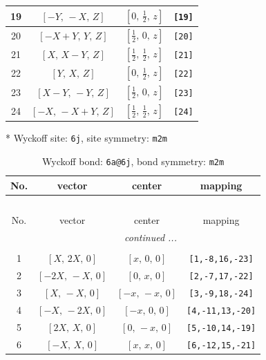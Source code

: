 \documentclass[fleqn,8pt]{jsarticle}
\begin{document}
\begin{longtable}{cccc}
19 & $\left[ - Y,\, - X,\, Z \right]$ & $\left[ 0,\, \frac{1}{2},\, z \right]$ & {\tt [19]} \\ \hline
20 & $\left[ - X + Y,\, Y,\, Z \right]$ & $\left[ \frac{1}{2},\, 0,\, z \right]$ & {\tt [20]} \\ \hline
21 & $\left[ X,\, X - Y,\, Z \right]$ & $\left[ \frac{1}{2},\, \frac{1}{2},\, z \right]$ & {\tt [21]} \\ \hline
22 & $\left[ Y,\, X,\, Z \right]$ & $\left[ 0,\, \frac{1}{2},\, z \right]$ & {\tt [22]} \\ \hline
23 & $\left[ X - Y,\, - Y,\, Z \right]$ & $\left[ \frac{1}{2},\, 0,\, z \right]$ & {\tt [23]} \\ \hline
24 & $\left[ - X,\, - X + Y,\, Z \right]$ & $\left[ \frac{1}{2},\, \frac{1}{2},\, z \right]$ & {\tt [24]} \\
\end{longtable}
* Wyckoff site: {\tt 6j}, site symmetry: {\tt m2m}
\renewcommand{\arraystretch}{1.2}
\begin{longtable}{cccc}
\caption{Wyckoff bond: {\tt 6a@6j}, bond symmetry: {\tt m2m}}
 \\
 \hline \hline
No. & vector & center & mapping \\ \hline \endfirsthead

\multicolumn{3}{l}{\tablename\ \thetable{}} \\
 \hline \hline
No. & vector & center & mapping \\ \hline \endhead

 \hline \hline
\multicolumn{3}{r}{\footnotesize\it continued ...} \\ \endfoot

 \hline \hline
\multicolumn{3}{r}{} \\ \endlastfoot

1 & $\left[ X,\, 2 X,\, 0 \right]$ & $\left[ x,\, 0,\, 0 \right]$ & {\tt [1,-8,16,-23]} \\ \hline
2 & $\left[ - 2 X,\, - X,\, 0 \right]$ & $\left[ 0,\, x,\, 0 \right]$ & {\tt [2,-7,17,-22]} \\ \hline
3 & $\left[ X,\, - X,\, 0 \right]$ & $\left[ - x,\, - x,\, 0 \right]$ & {\tt [3,-9,18,-24]} \\ \hline
4 & $\left[ - X,\, - 2 X,\, 0 \right]$ & $\left[ - x,\, 0,\, 0 \right]$ & {\tt [4,-11,13,-20]} \\ \hline
5 & $\left[ 2 X,\, X,\, 0 \right]$ & $\left[ 0,\, - x,\, 0 \right]$ & {\tt [5,-10,14,-19]} \\ \hline
6 & $\left[ - X,\, X,\, 0 \right]$ & $\left[ x,\, x,\, 0 \right]$ & {\tt [6,-12,15,-21]} \\
\end{longtable}
\end{document}
